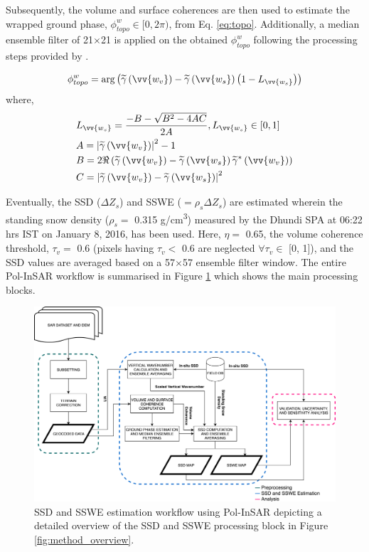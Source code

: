 \documentclass[review]{elsarticle}
\numberwithin{equation}{section}
\numberwithin{figure}{section}
\numberwithin{table}{section}
\begin{document}
Subsequently, the volume and surface coherences are then used to estimate the wrapped ground phase, $\phi_{topo}^w \in [0, 2\pi)$, from Eq. \eqref{eq:topo}. Additionally, a median ensemble filter of 21$\times$21 is applied on the obtained $\phi_{topo}^w$ following the processing steps provided by \cite{Cloude2005}.

\begin{equation}
    \label{eq:topo}
    \phi_{topo}^w = \arg\left(\widetilde{\gamma}\left(\vv{w_v}\right) - \widetilde{\gamma}\left(\vv{w_s}\right)\left(1 - L_{\vv{w_s}}\right)\right)
\end{equation}
where,
\begin{align*}
    & L_{\vv{w_s}} = \frac{-B - \sqrt{B^2 - 4AC}}{2A}, L_{\vv{w_s}} \in [0, 1] \\
    & A = \left\lvert\widetilde{\gamma}\left(\vv{w_v}\right)\right\rvert^2 - 1 \\
    & B = 2\Re\left(\widetilde{\gamma}\left(\vv{w_v}\right) - \widetilde{\gamma}\left(\vv{w_s}\right)\widetilde{\gamma}^*\left(\vv{w_v}\right)\right) \\
    & C = \left\lvert\widetilde{\gamma}\left(\vv{w_v}\right) - \widetilde{\gamma}\left(\vv{w_s}\right)\right\rvert^2
\end{align*}

Eventually, the SSD ($\Delta{Z_s}$) and SSWE ($=\rho_s\Delta{Z_s}$) are estimated wherein the standing snow density ($\rho_s = $ 0.315 g/cm\textsuperscript{3}) measured by the Dhundi SPA at 06:22 hrs IST on January 8, 2016, has been used. Here, $\eta = $ 0.65, the volume coherence threshold, $\tau_v = $ 0.6 (pixels having $\tau_v < $ 0.6 are neglected $\forall\tau_v \in$ [0, 1]), and the SSD values are averaged based on a 57$\times$57 ensemble filter window. The entire Pol-InSAR workflow is summarised in Figure \ref{fig:ssd_method} which shows the main processing blocks.

\begin{figure}[htb]
    \centering
    \includegraphics[width=\textwidth]{Figures/Methods/SSD_Method.png}
    \caption{SSD and SSWE estimation workflow using Pol-InSAR depicting a detailed overview of the SSD and SSWE processing block in Figure \ref{fig:method_overview}.}
    \label{fig:ssd_method}
\end{figure}
\end{document}
